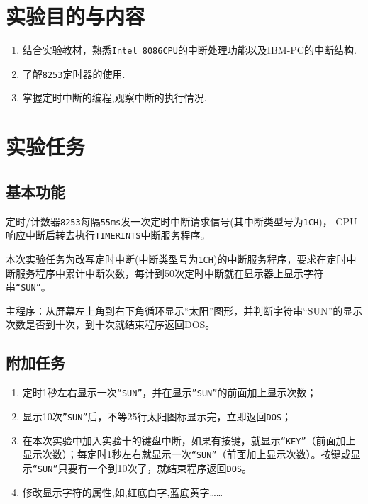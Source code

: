 \documentclass[11pt]{SEU-Digital-Report}
\begin{document}
\exptitlepage

\tableofcontents
\newpage

\section{实验目的与内容}       
\begin{enumerate}
    \item 结合实验教材\cite{book,guide}，熟悉\texttt{Intel 8086CPU}的中断处理功能以及IBM-PC的中断结构.
    \item 了解\texttt{8253}定时器的使用.
    \item 掌握定时中断的编程,观察中断的执行情况. 
\end{enumerate}

\section{实验任务}
\subsection{基本功能}
定时/计数器\texttt{8253}每隔\texttt{55ms}发一次定时中断请求信号(其中断类型号为\texttt{1CH})， CPU响应中断后转去执行\texttt{TIMERINTS}中断服务程序。

本次实验任务为改写定时中断(中断类型号为\texttt{1CH})的中断服务程序，要求在定时中断服务程序中累计中断次数，每计到50次定时中断就在显示器上显示字符串\texttt{“SUN”}。

主程序：从屏幕左上角到右下角循环显示“太阳”图形，并判断字符串“SUN”的显示次数是否到十次，到十次就结束程序返回DOS。



\subsection{附加任务}
\begin{enumerate}
    \item 定时1秒左右显示一次\texttt{“SUN”}，并在显示\texttt{”SUN”}的前面加上显示次数；
    \item 显示10次\texttt{”SUN”}后，不等25行太阳图标显示完，立即返回\texttt{DOS}；
    \item 在本次实验中加入实验十的键盘中断，如果有按键，就显示\texttt{“KEY”}（前面加上显示次数）；每定时1秒左右就显示一次\texttt{“SUN”}（前面加上显示次数）。按键或显示\texttt{“SUN”}只要有一个到10次了，就结束程序返回\texttt{DOS}。
    \item 修改显示字符的属性,如,红底白字,蓝底黄字…… 
\end{enumerate}
\end{document}
